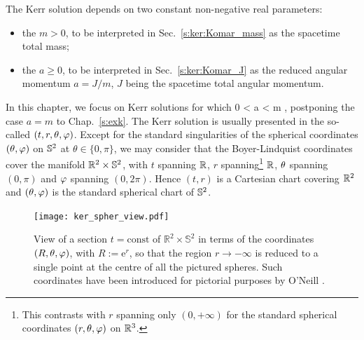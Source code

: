 The Kerr solution depends on two constant non-negative real parameters:
\begin{itemize}
\item the  $m > 0$, to be
interpreted in Sec.~\ref{s:ker:Komar_mass} as the spacetime total mass;
\item the  $a \geq 0 $,
to be interpreted in Sec.~\ref{s:ker:Komar_J} as the reduced angular momentum  $a=J/m$, $J$ being the
spacetime total angular momentum.
\end{itemize}
In this chapter, we focus on Kerr solutions for which
\be \label{e:ker:a_lower_m}
    0 < a < m ,
\ee
postponing the case $a=m$ to Chap.~\ref{s:exk}.
The Kerr solution is usually presented in the so-called
$(t,r,\theta,\varphi)$. Except for the standard singularities of the
spherical coordinates $(\theta,\varphi)$ on $\mathbb{S}^2$ at $\theta\in\{0,\pi\}$,
we may consider that the Boyer-Lindquist coordinates cover the manifold
$\mathbb{R}^2\times\mathbb{S}^2$, with $t$ spanning $\mathbb{R}$, $r$
spanning\footnote{This contrasts with $r$ spanning only $(0,+\infty)$ for
the standard spherical coordinates $(r,\theta,\varphi)$ on $\mathbb{R}^3$.} $\mathbb{R}$,
$\theta$ spanning $(0,\pi)$ and $\varphi$ spanning $(0,2\pi)$. Hence
$(t,r)$ is a Cartesian chart covering $\mathbb{R}^2$ and $(\theta,\varphi)$ is the standard
spherical chart of $\mathbb{S}^2$.

\begin{figure}
\centerline{\texttt{[image: ker\_spher\_view.pdf]}}
\caption[]{\label{f:ker:spher_view} \footnotesize
View of a section $t=\mathrm{const}$ of $\mathbb{R}^2\times\mathbb{S}^2$
in terms of the coordinates $(R,\theta,\varphi)$, with $R:=\mathrm{e}^r$,
so that the region $r\rightarrow -\infty$
is reduced to a single point at the centre of all the pictured spheres.
Such coordinates have been introduced for pictorial purposes by O'Neill
\cite{ONeil95}.}
\end{figure}


